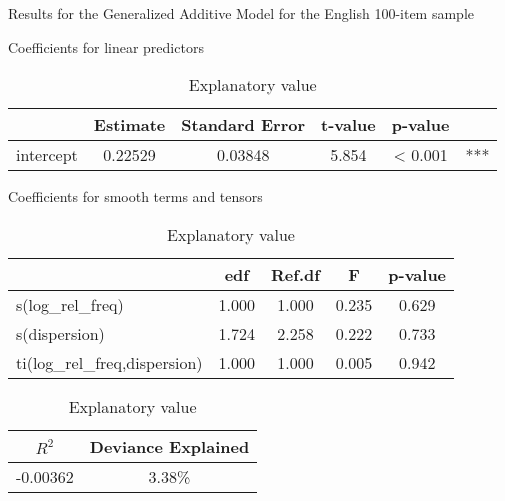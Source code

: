 \begin{table}[h!]

  \caption{Results for the Generalized Additive Model for the English 100-item sample}
  \label{tab:GAM-Eng-100}

  \begin{subtable}[h]{\textwidth}
    \centering
    \caption{Coefficients for linear predictors}
    \begin{tabular}{ l c c c c c }
      {       } & Estimate & Standard Error & t-value & p-value & { }\\
      \midrule
      intercept & 0.22529  & 0.03848        & 5.854   & < 0.001 & ***\\
    \end{tabular}
  \end{subtable}

  \vspace{1em}

  \begin{subtable}[h]{\textwidth}
    \centering
    \caption{Coefficients for smooth terms and tensors}
    \begin{tabular}{ l c c c c }
      { }                           & edf   & Ref.df & F     & p-value\\
      \midrule
      s(log\_rel\_freq)             & 1.000 & 1.000  & 0.235 & 0.629\\
      s(dispersion)                 & 1.724 & 2.258  & 0.222 & 0.733\\
      ti(log\_rel\_freq,dispersion) & 1.000 & 1.000  & 0.005 & 0.942\\
    \end{tabular}
  \end{subtable}

  \vspace{1em}

  \begin{subtable}[h]{\textwidth}
    \centering
    \caption{Explanatory value}
    \begin{tabular}{ c c }
      $R^2$    & Deviance Explained\\
      \midrule
      -0.00362 & 3.38\%\\
    \end{tabular}
  \end{subtable}

\end{table}

